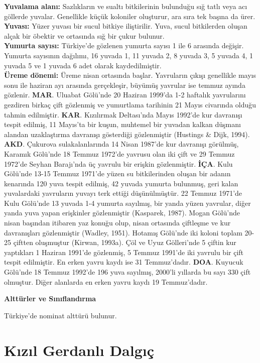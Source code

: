 \documentclass[
  a4paper,
  DIV=11,
  numbers=noendperiod]{scrreprt}
\begin{document}
\textbf{Yuvalama alanı:} Sazlıkların ve sualtı bitkilerinin bulunduğu
sığ tatlı veya acı göllerde yuvalar. Genellikle küçük koloniler
oluşturur, ara sıra tek başına da ürer.\\
\textbf{Yuvası:} Yüzer yuvası bir sucul bitkiye iliştirilir. Yuva, sucul
bitkilerden oluşan alçak bir öbektir ve ortasında sığ bir çukur
bulunur.\\
\textbf{Yumurta sayısı:} Türkiye'de gözlenen yumurta sayısı 1 ile 6
arasında değişir. Yumurta sayısının dağılımı, 16 yuvada 1, 11 yuvada 2,
8 yuvada 3, 5 yuvada 4, 1 yuvada 5 ve 1 yuvada 6 adet olarak
kaydedilmiştir.\\
\textbf{Üreme dönemi:} Üreme nisan ortasında başlar. Yavruların çıkışı
genellikle mayıs sonu ile haziran ayı arasında gerçekleşir, büyümüş
yavrular ise temmuz ayında gözlenir. \textbf{MAR}. Uluabat Gölü'nde 20
Haziran 1999'da 1-2 haftalık yavrularını gezdiren birkaç çift gözlenmiş
ve yumurtlama tarihinin 21 Mayıs civarında olduğu tahmin edilmiştir.
\textbf{KAR}. Kızılırmak Deltası'nda Mayıs 1992'de kur davranışı tespit
edilmiş, 11 Mayıs'ta bir kuşun, muhtemel bir yuvadan kalkan düşmanı
alandan uzaklaştırma davranışı gösterdiği gözlenmiştir (Hustings \&
Dijk, 1994). \textbf{AKD}. Çukurova sulakalanlarında 14 Nisan 1987'de
kur davranışı görülmüş, Karamık Gölü'nde 18 Temmuz 1972'de yavrusu olan
iki çift ve 29 Temmuz 1972'de Seyhan Barajı'nda üç yavrulu bir erişkin
gözlenmiştir. \textbf{İÇA}. Kulu Gölü'nde 13-15 Temmuz 1971'de yüzen su
bitkilerinden oluşan bir adanın kenarında 120 yuva tespit edilmiş, 42
yuvada yumurta bulunmuş, geri kalan yuvalardaki yavruların yuvayı terk
ettiği düşünülmüştür. 22 Temmuz 1971'de Kulu Gölü'nde 13 yuvada 1-4
yumurta sayılmış, bir yanda yüzen yavrular, diğer yanda yuva yapan
erişkinler gözlenmiştir (Kasparek, 1987). Mogan Gölü'nde nisan başından
itibaren yaz konuğu olup, nisan ortasında çiftleşme ve kur davranışları
gözlenmiştir (Wadley, 1951). Hotamış Gölü'nde iki koloni toplam 20-25
çiftten oluşmuştur (Kirwan, 1993a). Çöl ve Uyuz Gölleri'nde 5 çiftin kur
yaptıkları 1 Haziran 1991'de gözlenmiş, 5 Temmuz 1991'de iki yavrulu bir
çift tespit edilmiştir. En erken yavru kaydı ise 31 Temmuz'dadır.
\textbf{DOA}. Kuyucuk Gölü'nde 18 Temmuz 1992'de 196 yuva sayılmış,
2000'li yıllarda bu sayı 330 çift olmuştur. Diğer alanlarda en erken
yavru kaydı 19 Temmuz'dadır.

\textbf{Alttürler ve Sınıflandırma}

Türkiye'de nominat alttürü bulunur.

\section{Kızıl Gerdanlı
Dalgıç}\label{kux131zux131l-gerdanlux131-dalgux131uxe7}
\end{document}
